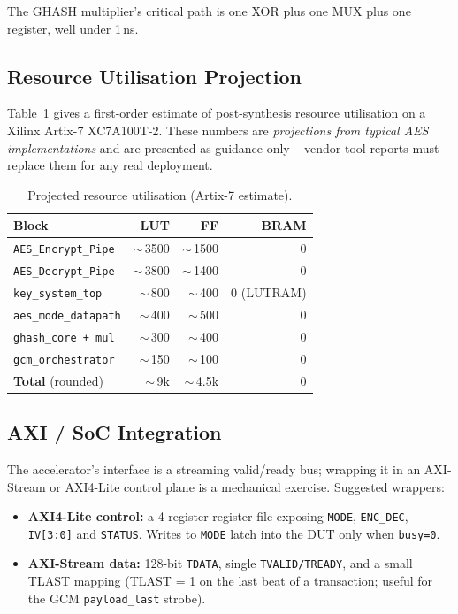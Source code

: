 \documentclass[conference,10pt,a4paper]{IEEEtran}
\begin{document}
The GHASH multiplier's critical path is one XOR plus one MUX plus one
register, well under 1\,ns.

\subsection{Resource Utilisation Projection}
Table~\ref{tab:util} gives a first-order estimate of post-synthesis
resource utilisation on a Xilinx Artix-7 XC7A100T-2.  These numbers are
\emph{projections from typical AES implementations} and are presented
as guidance only -- vendor-tool reports must replace them for any real
deployment.

\begin{table}[t]
\caption{Projected resource utilisation (Artix-7 estimate).}
\label{tab:util}
\centering
\begin{tabular}{l r r r}
\toprule
\textbf{Block} & \textbf{LUT} & \textbf{FF} & \textbf{BRAM} \\
\midrule
\texttt{AES\_Encrypt\_Pipe}  & $\sim$\,3500 & $\sim$\,1500 & 0 \\
\texttt{AES\_Decrypt\_Pipe}  & $\sim$\,3800 & $\sim$\,1400 & 0 \\
\texttt{key\_system\_top}    & $\sim$\,800  & $\sim$\,400  & 0 (LUTRAM) \\
\texttt{aes\_mode\_datapath} & $\sim$\,400  & $\sim$\,500  & 0 \\
\texttt{ghash\_core + mul}   & $\sim$\,300  & $\sim$\,400  & 0 \\
\texttt{gcm\_orchestrator}   & $\sim$\,150  & $\sim$\,100  & 0 \\
\midrule
\textbf{Total} (rounded) & $\sim$\,9k & $\sim$\,4.5k & 0 \\
\bottomrule
\end{tabular}
\end{table}

\subsection{AXI / SoC Integration}
The accelerator's interface is a streaming valid/ready bus; wrapping
it in an AXI-Stream or AXI4-Lite control plane is a mechanical
exercise.  Suggested wrappers:
\begin{itemize}[leftmargin=*]
  \item \textbf{AXI4-Lite control:} a 4-register register file exposing
        \texttt{MODE}, \texttt{ENC\_DEC}, \texttt{IV[3:0]} and
        \texttt{STATUS}.  Writes to \texttt{MODE} latch into the DUT
        only when \texttt{busy=0}.
  \item \textbf{AXI-Stream data:} 128-bit \texttt{TDATA}, single
        \texttt{TVALID/TREADY}, and a small TLAST mapping (TLAST = 1
        on the last beat of a transaction; useful for the GCM
        \texttt{payload\_last} strobe).
\end{itemize}
\end{document}
